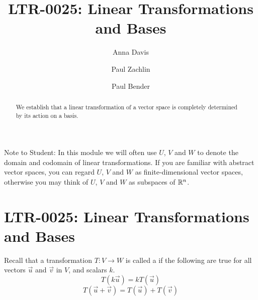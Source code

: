 \documentclass{ximera}
\author{Anna Davis \and Paul Zachlin \and Paul Bender} \title{LTR-0025: Linear Transformations and Bases} \license{CC-BY 4.0}
\begin{document}
\begin{abstract}
We establish that a linear transformation of a vector space is completely determined by its action on a basis. 
\end{abstract}
\maketitle

Note to Student:  In this module we will often use $U$, $V$ and $W$ to denote the domain and codomain of linear transformations.  If you are familiar with abstract vector spaces, you can regard $U$, $V$ and $W$ as finite-dimensional vector spaces, otherwise you may think of $U$, $V$ and $W$ as subspaces of $\mathbb{R}^n$.

\section*{LTR-0025: Linear Transformations and Bases}

Recall that a transformation $T:V\rightarrow W$ is called a  if the following are true for all vectors $\vec{u}$ and $\vec{v}$ in $V$, and scalars $k$.
\begin{equation*}
T(k\vec{u})= kT(\vec{u})
\end{equation*}
\begin{equation*}
T(\vec{u}+\vec{v})= T(\vec{u})+T(\vec{v})
\end{equation*}
\end{document}
